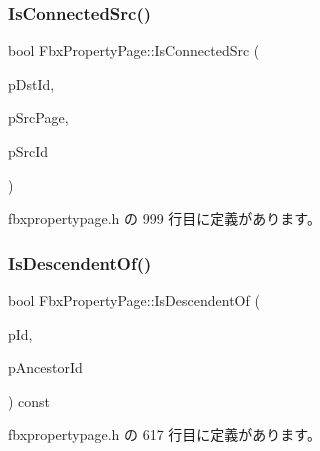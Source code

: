 \subsubsection{\texorpdfstring{Is\+Connected\+Src()}{IsConnectedSrc()}}
{\footnotesize\ttfamily bool Fbx\+Property\+Page\+::\+Is\+Connected\+Src (\begin{DoxyParamCaption}\item[{\hyperlink{fbxtypes_8h_a088fa96de3b0b3ea69f0f6afef525dfb}{Fbx\+Int}}]{p\+Dst\+Id,  }\item[{\hyperlink{class_fbx_property_page}{Fbx\+Property\+Page} $\ast$}]{p\+Src\+Page,  }\item[{\hyperlink{fbxtypes_8h_a088fa96de3b0b3ea69f0f6afef525dfb}{Fbx\+Int}}]{p\+Src\+Id }\end{DoxyParamCaption})\hspace{0.3cm}{\ttfamily [inline]}}



 fbxpropertypage.\+h の 999 行目に定義があります。

\mbox{\label{class_fbx_property_page_aa56d7641c8141df83d1ada2e3971068f}} 
\subsubsection{\texorpdfstring{Is\+Descendent\+Of()}{IsDescendentOf()}}
{\footnotesize\ttfamily bool Fbx\+Property\+Page\+::\+Is\+Descendent\+Of (\begin{DoxyParamCaption}\item[{\hyperlink{fbxtypes_8h_a088fa96de3b0b3ea69f0f6afef525dfb}{Fbx\+Int}}]{p\+Id,  }\item[{\hyperlink{fbxtypes_8h_a088fa96de3b0b3ea69f0f6afef525dfb}{Fbx\+Int}}]{p\+Ancestor\+Id }\end{DoxyParamCaption}) const\hspace{0.3cm}{\ttfamily [inline]}}



 fbxpropertypage.\+h の 617 行目に定義があります。

\mbox{\label{class_fbx_property_page_a74f788300f24f87da57f6e3d7cad5eea}} 
